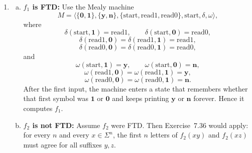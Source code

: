 \begin{enumerate}[{7.}1.]
\begin{enumerate}[(a)]
  \item $M/_{E_M}$ is reduced:

  \begin{proof}
  Suppose $[s]_{E_M}$ and $[t]_{E_M}$ are equivalent states of $M/_{E_M}$.  Then
  for every $y\in\Sigma^*$,
  \[
    \OBAR_{E_M}([s]_{E_M},y)=\OBAR_{E_M}([t]_{E_M},y).
  \]
  By part~(a), this implies
  \[
    \OBAR(s,y)=\OBAR(t,y)
  \]
  for every $y$.  Hence $s E_M t$, so $[s]_{E_M}=[t]_{E_M}$.  Therefore
  $M/_{E_M}$ is reduced.
  \end{proof}

  \item If $M$ connected, $M/_{E_M}$ connected:

  \begin{proof}
  Let $[t]_{E_M}$ be any state of the quotient.  Since $M$ is connected, there
  exists $x\in\Sigma^*$ with $\DBAR(s_0,x)=t$.  We claim that
  \[
    \DBAR_{E_M}([s_0]_{E_M},x)=[t]_{E_M}.
  \]
  This follows by induction on $|x|$ from the definition of $\delta_{E_M}$.
  Hence every quotient state is reachable from the quotient start state, so the
  quotient is connected.
  \end{proof}
\end{enumerate}

\item \begin{enumerate}[(a)]
  \item \textbf{$f_1$ is FTD:}  Use the Mealy machine
  \[
    M=\langle\{\pmb{0},\pmb{1}\},\{\pmb{y},\pmb{n}\},
    \{\text{start},\text{read1},\text{read0}\},
    \text{start},\delta,\omega\rangle,
  \]
  where
  \[
    \delta(\text{start},\pmb{1})=\text{read1},\qquad
    \delta(\text{start},\pmb{0})=\text{read0},
  \]
  \[
    \delta(\text{read1},\pmb{0})=\delta(\text{read1},\pmb{1})=\text{read1},
  \]
  \[
    \delta(\text{read0},\pmb{0})=\delta(\text{read0},\pmb{1})=\text{read0},
  \]
  and
  \[
    \omega(\text{start},\pmb{1})=\pmb{y},\qquad
    \omega(\text{start},\pmb{0})=\pmb{n},
  \]
  \[
    \omega(\text{read1},\pmb{0})=\omega(\text{read1},\pmb{1})=\pmb{y},
  \]
  \[
    \omega(\text{read0},\pmb{0})=\omega(\text{read0},\pmb{1})=\pmb{n}.
  \]
  After the first input, the machine enters a state that remembers whether that
  first symbol was $\pmb{1}$ or $\pmb{0}$ and keeps printing $\pmb{y}$ or
  $\pmb{n}$ forever.  Hence it computes $f_1$.

  \item \textbf{$f_2$ is not FTD:}  Assume $f_2$ were FTD.  Then Exercise~7.36
  would apply: for every $n$ and every $x\in\Sigma^n$, the first $n$ letters of
  $f_2(xy)$ and $f_2(xz)$ must agree for all suffixes $y,z$.


\end{enumerate}
\end{enumerate}
